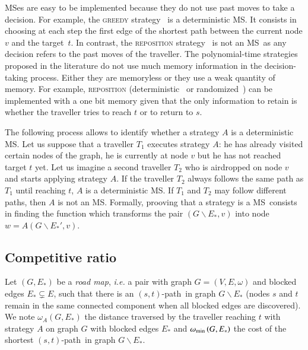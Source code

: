 \documentclass[preprint]{elsarticle}
\newcommand{\stpath}{$(s,t)$-path}
\newcommand{\omegamin}{\omega_{\mbox{\scriptsize{min}}}}
\newcommand{\mts}{MS}
\begin{document}
\mts es are easy to be implemented because they do not use past moves to take a decision.
For example, the \textsc{greedy} strategy~\cite{XuHuSuZh09} is a deterministic \mts . It consists in choosing at each step the first edge of the shortest path between the current node $v$ and the target~$t$. 
In contrast, the \textsc{reposition} strategy~\cite{We08} is not an \mts ~as any decision refers to the past moves of the traveller. The polynomial-time strategies proposed in the literature do not use much memory information in the decision-taking process. Either they are memoryless or they use a weak quantity of memory. For example, \textsc{reposition} (deterministic~\cite{We08} or randomized~\cite{BeWe15}) can be implemented with a  one bit memory given that the only information to retain is whether the traveller tries to reach $t$ or to return to $s$.

The following process allows to identify whether a strategy $A$ is a deterministic \mts . Let us suppose that a traveller $T_1$ executes strategy $A$: he has already visited certain nodes of the graph, he is currently at node $v$ but he has not reached target $t$ yet. Let us imagine a second traveller $T_2$ who is airdropped on node $v$ and starts applying strategy $A$. If the traveller $T_2$ always follows the same path as $T_1$ until reaching $t$, $A$ is a deterministic \mts . If $T_1$ and $T_2$ may follow different paths, then $A$ is not an \mts . Formally, prooving that a strategy is a \mts ~consists in finding the function which transforms the pair $\left(G\backslash E_*,v\right)$ into node $w = A\left(G\backslash E_*',v\right)$.

\subsection{Competitive ratio} \label{subsec:compratio}

Let $\left(G,E_*\right)$ be a \textit{road map}, {\em i.e.} a pair with graph $G=\left(V,E,\omega\right)$ and blocked edges $E_* \subsetneq E$, such that there is an \stpath ~in graph $G\backslash E_*$ (nodes $s$ and $t$ remain in the same connected component when all blocked edges are discovered). We note $\omega_A\left(G,E_*\right)$ the distance traversed by the traveller reaching $t$ with strategy $A$ on graph $G$ with blocked edges $E_*$ and $\omegamin\left(G,E_*\right)$ the cost of the shortest \stpath ~in graph $G\backslash E_*$.
\end{document}
